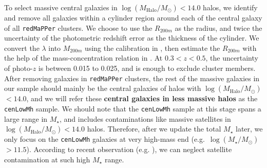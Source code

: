 \documentclass[a4paper,fleqn,usenatbib]{mnras}
\def\redm{\texttt{redMaPPer}}
\def\nbcg{\texttt{cenLowMh}}
\def\mstar{{$M_{\star}$}}
\def\logms{{$\log (M_{\star}/M_{\odot})$}}
\def\logmh{{$\log (M_{\mathrm{Halo}}/M_{\odot})$}}
\begin{document}
    To select massive central galaxies in \logmh{}$<14.0$ halos, we identify and 
    remove all galaxies within a cylinder region around each of the central galaxy of 
    all \redm{} clusters.
    We choose to use the $R_{200m}$ as the radius, and twice the uncertainty of the 
    photometric redshift error as the thickness of the cylinder. 
    We convert the $\lambda$ into $M_{200m}$ using the calibration in 
    \citet{Simet2016}, then estimate the $R_{200m}$ with the help of the 
    mass-concentration relation in \citet{Diemer2015}. 
    At $0.3 < z < 0.5$, the uncertainty of photo-$z$ is between 0.015 to 0.025, 
    and is enough to exclude cluster members.
    After removing galaxies in \redm{} clusters, the rest of the massive galaxies 
    in our sample should mainly be the central galaxies of halos with \logmh{}$<14.0$,
    and we will refer these \textbf{central galaxies in less massive halos} as the 
    \nbcg{} sample.
    We should note that the \nbcg{} sample at this stage spans a large range in 
    \mstar{}, and includes contaminations like massive satellites in \logmh{}$< 14.0$ 
    halos.  
    Therefore, after we update the total \mstar{} later, we only focus on the 
    \nbcg{} galaxies at very high-mass end (e.g.~\logms{}$ > 11.5$). 
    According to recent observation (e.g. \citealt{vanUitert2016}), we can neglect 
    satellite contamination at such high \mstar{} range. 
    
\end{document}
